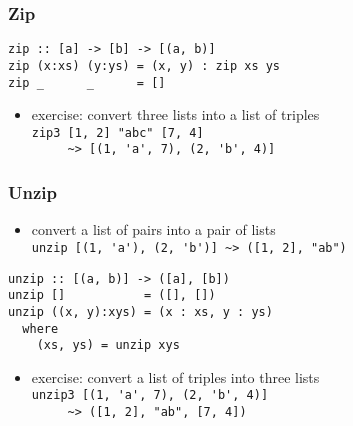 \documentclass[dvipsnames]{beamer}
\theoremstyle{plain}
\begin{document}
\begin{frame}[fragile]
  \frametitle{Zip}

  \begin{exampleblock}{}
    \begin{lstlisting}[deletekeywords={zip}]
zip :: [a] -> [b] -> [(a, b)]
zip (x:xs) (y:ys) = (x, y) : zip xs ys
zip _      _      = []
    \end{lstlisting}
  \end{exampleblock}

  \pause
  \begin{itemize}
    \item exercise: convert three lists into a list of triples\\
      \lstinline[style=exclamfix]|zip3 [1, 2] "abc" [7, 4]|\\
      \lstinline[style=exclamfix]|     ~> [(1, 'a', 7), (2, 'b', 4)]|
  \end{itemize}
\end{frame}

\begin{frame}[fragile]
  \frametitle{Unzip}

  \begin{itemize}
    \item convert a list of pairs into a pair of lists\\
      \lstinline[style=exclamfix]|unzip [(1, 'a'), (2, 'b')] ~> ([1, 2], "ab")|
  \end{itemize}

  \begin{exampleblock}{}
    \begin{lstlisting}[deletekeywords={unzip}]
unzip :: [(a, b)] -> ([a], [b])
unzip []           = ([], [])
unzip ((x, y):xys) = (x : xs, y : ys)
  where
    (xs, ys) = unzip xys
    \end{lstlisting}
  \end{exampleblock}

  \pause
  \begin{itemize}
    \item exercise: convert a list of triples into three lists\\
      \lstinline[style=exclamfix]|unzip3 [(1, 'a', 7), (2, 'b', 4)]|\\
      \lstinline[style=exclamfix]|     ~> ([1, 2], "ab", [7, 4])|
  \end{itemize}
\end{frame}

\end{document}
